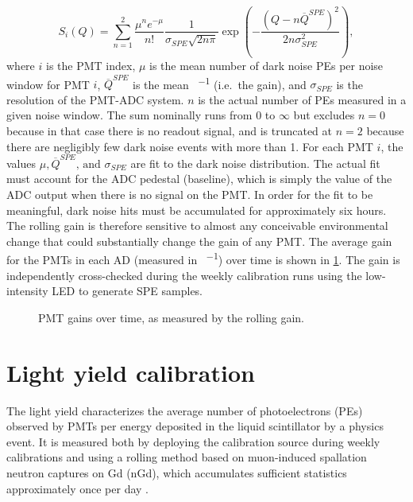 \begin{equation}
    S_i(Q) = \sum_{n=1}^2 \frac{\mu^n e^{-\mu}}{n!}
    \frac{1}{\sigma_{SPE}\sqrt{2n\pi}}
    \exp
    \left(
        -\frac{(Q-n\overline{Q}^{SPE})^2}{2n\sigma^2_{SPE}}
    \right),
\end{equation}
where $i$ is the PMT index,
$\mu$ is the mean number of dark noise PEs per noise window for PMT $i$,
$\overline{Q}^{SPE}$ is the mean \si{\adc\per\pe} (i.e.\ the gain),
and $\sigma_{SPE}$ is the resolution of the PMT-ADC system.
$n$ is the actual number of PEs measured in a given noise window.
The sum nominally runs from $0$ to $\infty$ but
excludes $n=0$ because in that case there is no readout signal,
and is truncated at $n=2$ because there are negligibly few dark noise events
with more than \SI{1}{\pe}.
For each PMT $i$, the values $\mu,\overline{Q}^{SPE}\text{, and }\sigma_{SPE}$ are fit
to the dark noise distribution.
The actual fit must account for the ADC pedestal (baseline),
which is simply the value of the ADC output when there is no signal on the PMT.
In order for the fit to be meaningful, dark noise hits must be accumulated
for approximately six hours.
The rolling gain is therefore sensitive to almost any conceivable
environmental change that could substantially change the gain of any PMT.
The average gain for the PMTs in each AD (measured in \si{\adc\per\pe})
over time is shown in \cref{fig:gain}.
The gain is independently cross-checked during the weekly calibration runs
using the low-intensity LED to generate SPE samples.

\begin{figure}
    \caption{PMT gains over time, as measured by the rolling gain.}
    \label{fig:gain}
\end{figure}

\section{Light yield calibration}
\label{sec:light_yield_calib}

The light yield characterizes the average
number of photoelectrons (PEs) observed by PMTs
per energy deposited in the liquid scintillator
by a physics event.
It is measured both by deploying the  calibration source
during weekly calibrations
and using a rolling method based on muon-induced spallation neutron
captures on Gd (nGd), which accumulates sufficient statistics
approximately once per day .

